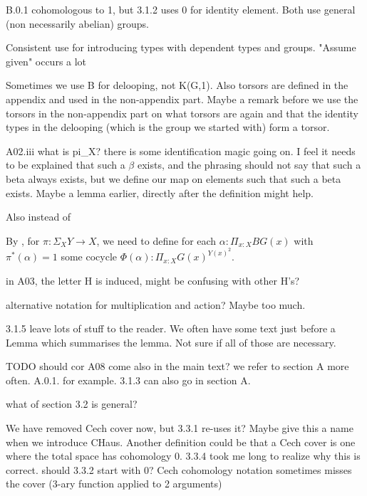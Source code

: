 B.0.1 cohomologous to 1, but 3.1.2 uses 0 for identity element. Both use general (non necessarily abelian) groups. 

Consistent use for introducing types with dependent types and groups. 
"Assume given" occurs a lot

Sometimes we use B for delooping, not K(G,1). Also torsors are defined in the appendix and used in the non-appendix part. 
Maybe a remark before we use the torsors in the non-appendix part on what torsors are again and that the identity types in the delooping (which is the group we started with) form a torsor. 

A02.iii what is pi_X? there is some identification magic going on. I feel it needs to be explained that such a $\beta$ exists, and the phrasing should not say that such a beta always exists, but we define our map on elements such that such a beta exists. Maybe a lemma earlier, directly after the definition might help. 

Also \psi instead of \phi
\item By , for $\pi:\Sigma_XY\to X$, we need to define for each $\alpha: \Pi_{x:X}BG(x)$ with $\pi^*(\alpha)=1$ some cocycle $\Phi(\alpha):\Pi_{x:X}G(x)^{Y(x)^2}$. 

in A03, the letter H is induced, might be confusing with other H's? 

alternative notation for multiplication and action? Maybe too much. 

3.1.5 leave lots of stuff to the reader.
We often have some text just before a Lemma which summarises the lemma. Not sure if all of those are necessary. 

TODO should cor A08 come also in the main text? 
we refer to section A more often. A.0.1. for example. 3.1.3 can also go in section A. 

what of section 3.2 is general?

We have removed Cech cover now, but 3.3.1 re-uses it? Maybe give this a name when we introduce CHaus. Another definition could be that a Cech cover is one where the total space has cohomology 0. 
3.3.4 took me long to realize why this is correct. 
should 3.3.2 start with 0? 
Cech cohomology notation sometimes misses the cover (3-ary function applied to 2 arguments)
